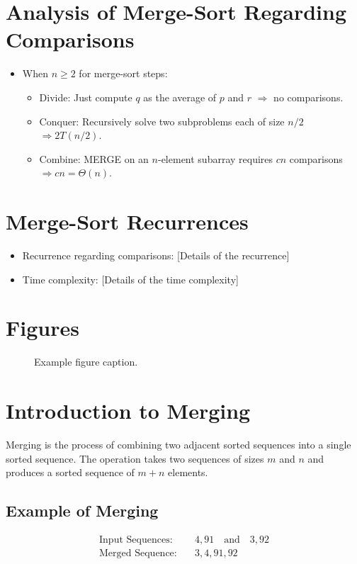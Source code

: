 \documentclass[12pt,openany]{book}
\theoremstyle{definition}
\begin{document}
	\section{Analysis of Merge-Sort Regarding Comparisons}
	\begin{itemize}
		\item When \( n \geq 2 \) for merge-sort steps:
		\begin{itemize}
			\item Divide: Just compute \( q \) as the average of \( p \) and \( r \) \( \Rightarrow \) no comparisons.
			\item Conquer: Recursively solve two subproblems each of size \( n/2 \) \( \Rightarrow 2T(n/2) \).
			\item Combine: MERGE on an \( n \)-element subarray requires \( cn \) comparisons \( \Rightarrow cn = \Theta(n) \).
		\end{itemize}
	\end{itemize}
	
	\section{Merge-Sort Recurrences}
	\begin{itemize}
		\item Recurrence regarding comparisons: [Details of the recurrence]
		\item Time complexity: [Details of the time complexity]
	\end{itemize}
	
	\section{Figures}
	\begin{figure}[h!]
		\centering
		\caption{Example figure caption.}
	\end{figure}

	\section{Introduction to Merging}
	Merging is the process of combining two adjacent sorted sequences into a single sorted sequence. The operation takes two sequences of sizes \( m \) and \( n \) and produces a sorted sequence of \( m + n \) elements.
	
	\subsection{Example of Merging}
	\begin{align*}
		\text{Input Sequences:} &\quad 4, 91 \quad \text{and} \quad 3, 92 \\
		\text{Merged Sequence:} &\quad 3, 4, 91, 92
	\end{align*}
	
\end{document}
